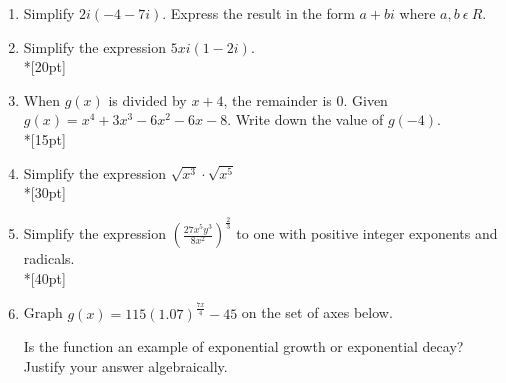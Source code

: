 \documentclass[12pt, oneside]{article}
\begin{document}
\begin{enumerate}
\item Simplify $2i(-4-7i)$. Express the result in the form $a+bi$ where $a,b \ \epsilon \ R$.\\[30pt]

\item Simplify the expression $5xi(1-2i)$.\\*[20pt]


\newpage

\item When $g(x)$ is divided by $x+4$, the remainder is 0. Given $g(x)=x^4+3x^3- 6x^2- 6x-8$. Write down the value of $g(-4)$.\\*[15pt]

\item Simplify the expression $\sqrt{x^3} \cdot \sqrt{x^5}$ \\*[30pt]

\item Simplify the expression $\displaystyle \left( \frac{27x^{5}y^3}{8x^2} \right)^{\frac{2}{3}}$ to one with positive integer exponents and radicals.\\*[40pt]


\newpage

\item Graph $\displaystyle g(x)= 115(1.07)^ {\frac{7x}{4}} -45$ on the set of axes below.
\begin{center}
\end{center}
Is the function an example of exponential growth or exponential decay? Justify your answer algebraically.\\[45pt]

\newpage


\end{enumerate}
\end{document}
